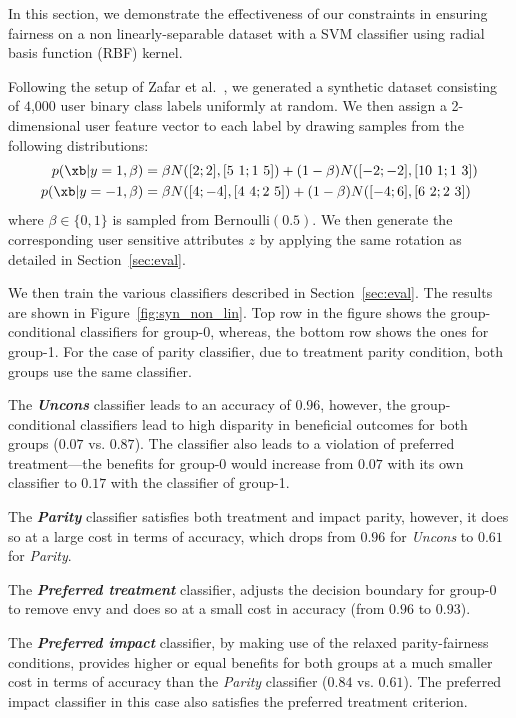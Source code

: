 \documentclass{article}
\newcommand{\emphb}[1]{\textbf{\emph{#1}}}
\begin{document}
\begin{appendix}
In this section, we demonstrate the effectiveness of our constraints in ensuring fairness on a non linearly-separable dataset with a SVM  classifier using radial basis function (RBF) kernel.

Following the setup of Zafar et al.~\cite{zafar_fairness},  we  generated a synthetic dataset consisting of $4$,$000$ user binary class labels uniformly at random. We then assign a 2-dimensional user feature vector to each label by drawing samples from the following distributions:
\begin{align*}
p(\xb| y=1, \beta) &= \beta N([2; 2], [5\,\, 1; 1\,\, 5]) +  (1-\beta) N([-2; -2], [10\,\, 1; 1\,\, 3]) \\
p(\xb | y=-1, \beta ) &= \beta N([4; -4], [4\,\, 4; 2\,\, 5]) +  (1-\beta) N([-4; 6], [6\,\, 2; 2\,\, 3])
\end{align*}
where $\beta \in\{0,1\}$ is sampled from $\mbox{Bernoulli}(0.5)$.
We then generate the corresponding user sensitive attributes $z$ by applying the same rotation as detailed in Section~\ref{sec:eval}.

We then train the various classifiers described in Section~\ref{sec:eval}. The results are shown in Figure~\ref{fig:syn_non_lin}. Top row in the figure shows the group-conditional classifiers for group-0, whereas, the bottom row shows the ones for group-1. For the case of parity classifier, due to treatment parity condition, both groups use the same classifier.

The \emphb{Uncons} classifier leads to an accuracy of $0.96$, however, the group-conditional classifiers lead to high disparity in beneficial outcomes for both groups ($0.07$ vs. $0.87$).
The classifier also leads to a violation of preferred treatment---the benefits for group-0 would increase from $0.07$ with its own classifier to $0.17$ with the classifier of group-1.

The \emphb{Parity} classifier satisfies both treatment and impact parity, however, it does so at a large cost in terms of accuracy, which drops from $0.96$ for \emph{Uncons} to $0.61$
for \emph{Parity}.


The \emphb{Preferred treatment} classifier, adjusts the decision boundary for group-0 to remove envy and does so at a small cost in accuracy (from $0.96$ to $0.93$).

The \emphb{Preferred impact} classifier, by making use of the relaxed parity-fairness conditions, provides higher or equal benefits for both groups at a much smaller cost in terms of accuracy than
the \emph{Parity} classifier ($0.84$ vs. $0.61$). The preferred impact classifier in this case also satisfies the preferred treatment criterion.




\end{appendix}
\end{document}
